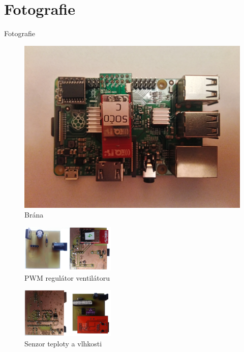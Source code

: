 \documentclass[11pt]{beamer}
\begin{document}
\section{Fotografie}

\begin{frame}{Fotografie}
  \begin{center}
      \begin{figure}
        \includegraphics[width = \textwidth]{../img/foto/brana.jpg}
        \caption{Brána}
      \end{figure}
    \endminipage
      \begin{figure}
          \includegraphics[width = 45mm]{../img/foto/iqrf-pwm-fan-controller.jpg}
          \caption{PWM regulátor ventilátoru}
      \end{figure}
      \begin{figure}
        \includegraphics[width = 45mm]{../img/foto/arduino-ethernet-sensor.jpg}
        \caption{Senzor teploty a vlhkosti}
      \end{figure}
    \endminipage
  \end{center}
\end{frame}
\end{document}
